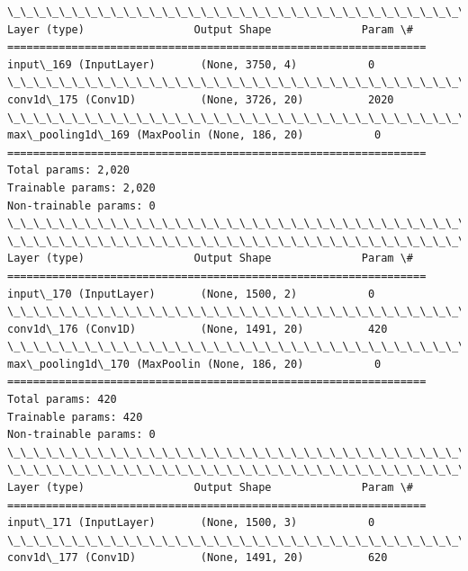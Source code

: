 \documentclass[11pt]{article}
\begin{document}
    \begin{Verbatim}[commandchars=\\\{\}]
\_\_\_\_\_\_\_\_\_\_\_\_\_\_\_\_\_\_\_\_\_\_\_\_\_\_\_\_\_\_\_\_\_\_\_\_\_\_\_\_\_\_\_\_\_\_\_\_\_\_\_\_\_\_\_\_\_\_\_\_\_\_\_\_\_
Layer (type)                 Output Shape              Param \#   
=================================================================
input\_169 (InputLayer)       (None, 3750, 4)           0         
\_\_\_\_\_\_\_\_\_\_\_\_\_\_\_\_\_\_\_\_\_\_\_\_\_\_\_\_\_\_\_\_\_\_\_\_\_\_\_\_\_\_\_\_\_\_\_\_\_\_\_\_\_\_\_\_\_\_\_\_\_\_\_\_\_
conv1d\_175 (Conv1D)          (None, 3726, 20)          2020      
\_\_\_\_\_\_\_\_\_\_\_\_\_\_\_\_\_\_\_\_\_\_\_\_\_\_\_\_\_\_\_\_\_\_\_\_\_\_\_\_\_\_\_\_\_\_\_\_\_\_\_\_\_\_\_\_\_\_\_\_\_\_\_\_\_
max\_pooling1d\_169 (MaxPoolin (None, 186, 20)           0         
=================================================================
Total params: 2,020
Trainable params: 2,020
Non-trainable params: 0
\_\_\_\_\_\_\_\_\_\_\_\_\_\_\_\_\_\_\_\_\_\_\_\_\_\_\_\_\_\_\_\_\_\_\_\_\_\_\_\_\_\_\_\_\_\_\_\_\_\_\_\_\_\_\_\_\_\_\_\_\_\_\_\_\_
\_\_\_\_\_\_\_\_\_\_\_\_\_\_\_\_\_\_\_\_\_\_\_\_\_\_\_\_\_\_\_\_\_\_\_\_\_\_\_\_\_\_\_\_\_\_\_\_\_\_\_\_\_\_\_\_\_\_\_\_\_\_\_\_\_
Layer (type)                 Output Shape              Param \#   
=================================================================
input\_170 (InputLayer)       (None, 1500, 2)           0         
\_\_\_\_\_\_\_\_\_\_\_\_\_\_\_\_\_\_\_\_\_\_\_\_\_\_\_\_\_\_\_\_\_\_\_\_\_\_\_\_\_\_\_\_\_\_\_\_\_\_\_\_\_\_\_\_\_\_\_\_\_\_\_\_\_
conv1d\_176 (Conv1D)          (None, 1491, 20)          420       
\_\_\_\_\_\_\_\_\_\_\_\_\_\_\_\_\_\_\_\_\_\_\_\_\_\_\_\_\_\_\_\_\_\_\_\_\_\_\_\_\_\_\_\_\_\_\_\_\_\_\_\_\_\_\_\_\_\_\_\_\_\_\_\_\_
max\_pooling1d\_170 (MaxPoolin (None, 186, 20)           0         
=================================================================
Total params: 420
Trainable params: 420
Non-trainable params: 0
\_\_\_\_\_\_\_\_\_\_\_\_\_\_\_\_\_\_\_\_\_\_\_\_\_\_\_\_\_\_\_\_\_\_\_\_\_\_\_\_\_\_\_\_\_\_\_\_\_\_\_\_\_\_\_\_\_\_\_\_\_\_\_\_\_
\_\_\_\_\_\_\_\_\_\_\_\_\_\_\_\_\_\_\_\_\_\_\_\_\_\_\_\_\_\_\_\_\_\_\_\_\_\_\_\_\_\_\_\_\_\_\_\_\_\_\_\_\_\_\_\_\_\_\_\_\_\_\_\_\_
Layer (type)                 Output Shape              Param \#   
=================================================================
input\_171 (InputLayer)       (None, 1500, 3)           0         
\_\_\_\_\_\_\_\_\_\_\_\_\_\_\_\_\_\_\_\_\_\_\_\_\_\_\_\_\_\_\_\_\_\_\_\_\_\_\_\_\_\_\_\_\_\_\_\_\_\_\_\_\_\_\_\_\_\_\_\_\_\_\_\_\_
conv1d\_177 (Conv1D)          (None, 1491, 20)          620       

\end{Verbatim}
\end{document}
